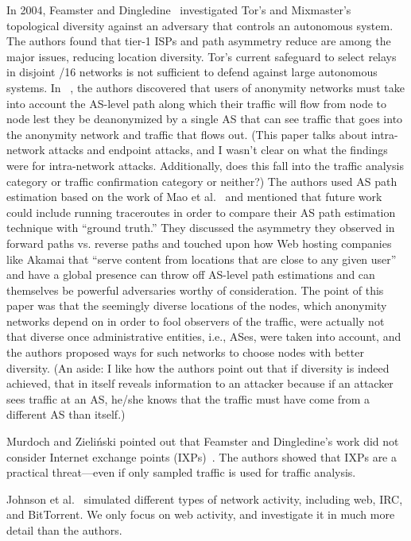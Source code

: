 In 2004, Feamster and Dingledine~\cite{Feamster2004a} investigated Tor's and
Mixmaster's topological diversity against an adversary that controls an
autonomous system.  The authors found that tier-1 ISPs and path asymmetry reduce
are among the major issues, reducing location diversity.  Tor's current
safeguard to select relays in disjoint /16 networks is not sufficient to defend
against large autonomous systems. In ~\cite{Feamster2004a}, the authors discovered 
that users of anonymity networks must take into account the AS-level path along 
which their traffic will flow from node to node lest they be deanonymized by a 
single AS that can see traffic that goes into the anonymity network and traffic that flows out. 
(This paper talks about intra-network attacks and endpoint attacks, and 
I wasn't clear on what the findings were for intra-network attacks. Additionally, 
does this fall into the traffic analysis category or traffic confirmation category or neither?) 
The authors used AS path estimation based on the work of Mao et al.~\cite{} and 
mentioned that future work could include running traceroutes in order to compare 
their AS path estimation technique with ``ground truth.'' They discussed the asymmetry 
they observed in forward paths vs. reverse paths and touched upon how Web hosting companies 
like Akamai that ``serve content from locations that are close to any given user''~\cite{Feamster2004a} 
and have a global presence can throw off AS-level path estimations and can themselves 
be powerful adversaries worthy of consideration. The point of this paper was that 
the seemingly diverse locations of the nodes, which anonymity networks depend on 
in order to fool observers of the traffic, were actually not that diverse once administrative 
entities, i.e., ASes, were taken into account, and the authors proposed ways for 
such networks to choose nodes with better diversity. (An aside: I like how the authors 
point out that if diversity is indeed achieved, that in itself reveals information 
to an attacker because if an attacker sees traffic at an AS, he/she knows that the 
traffic must have come from a different AS than itself.)

Murdoch and Zieli\'{n}ski pointed out that Feamster and Dingledine's work did
not consider Internet exchange points (IXPs)~\cite{Murdoch2007a}.  The authors
showed that IXPs are a practical threat---even if only sampled traffic is used
for traffic analysis.

Johnson et al.~\cite{Johnson2013a} simulated different types of network
activity, including web, IRC, and BitTorrent.  We only focus on web activity,
and investigate it in much more detail than the authors.

